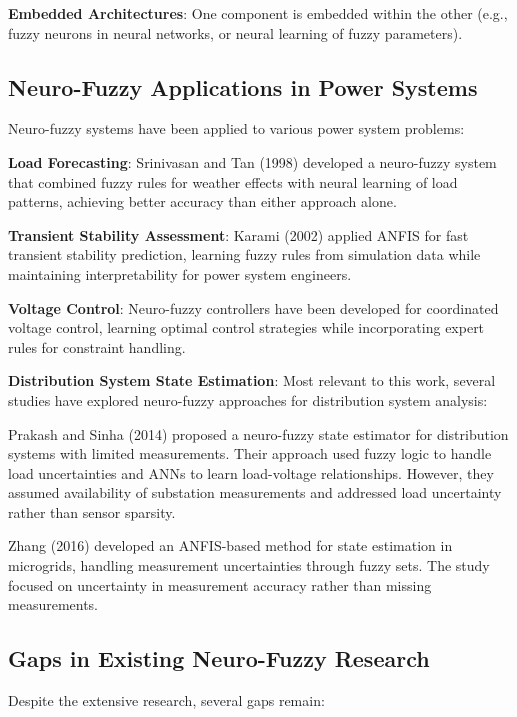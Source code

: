 \documentclass[12pt,a4paper]{report}
\begin{document}
\textbf{Embedded Architectures}: One component is embedded within the other (e.g., fuzzy neurons in neural networks, or neural learning of fuzzy parameters).

\subsection{Neuro-Fuzzy Applications in Power Systems}

Neuro-fuzzy systems have been applied to various power system problems:

\textbf{Load Forecasting}: Srinivasan and Tan (1998) developed a neuro-fuzzy system that combined fuzzy rules for weather effects with neural learning of load patterns, achieving better accuracy than either approach alone.

\textbf{Transient Stability Assessment}: Karami (2002) applied ANFIS for fast transient stability prediction, learning fuzzy rules from simulation data while maintaining interpretability for power system engineers.

\textbf{Voltage Control}: Neuro-fuzzy controllers have been developed for coordinated voltage control, learning optimal control strategies while incorporating expert rules for constraint handling.

\textbf{Distribution System State Estimation}: Most relevant to this work, several studies have explored neuro-fuzzy approaches for distribution system analysis:

Prakash and Sinha (2014) proposed a neuro-fuzzy state estimator for distribution systems with limited measurements. Their approach used fuzzy logic to handle load uncertainties and ANNs to learn load-voltage relationships. However, they assumed availability of substation measurements and addressed load uncertainty rather than sensor sparsity.

Zhang (2016) developed an ANFIS-based method for state estimation in microgrids, handling measurement uncertainties through fuzzy sets. The study focused on uncertainty in measurement accuracy rather than missing measurements.

\subsection{Gaps in Existing Neuro-Fuzzy Research}

Despite the extensive research, several gaps remain:
\end{document}

